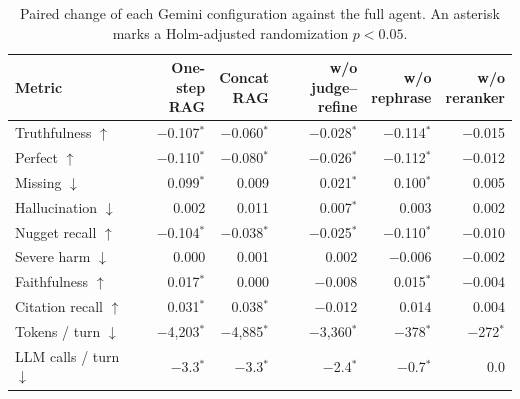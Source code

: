 \begin{table}[tb]
\centering
\caption{Paired change of each Gemini configuration against the full agent. An asterisk marks a Holm-adjusted randomization $p<0.05$.}\label{tab:e2e-ablation}
\footnotesize
\begin{tabular}{l@{\hspace{1em}}r@{\hspace{1em}}r@{\hspace{1em}}r@{\hspace{1em}}r@{\hspace{1em}}r}
\toprule
Metric & \colhead{One-step\\RAG} & \colhead{Concat\\RAG} & \colhead{w/o judge--\\refine} & \colhead{w/o\\rephrase} & \colhead{w/o\\reranker} \\
\midrule
Truthfulness $\uparrow$ & $-$0.107$^{*}$ & $-$0.060$^{*}$ & $-$0.028$^{*}$ & $-$0.114$^{*}$ & $-$0.015 \\
Perfect $\uparrow$ & $-$0.110$^{*}$ & $-$0.080$^{*}$ & $-$0.026$^{*}$ & $-$0.112$^{*}$ & $-$0.012 \\
Missing $\downarrow$ & 0.099$^{*}$ & 0.009 & 0.021$^{*}$ & 0.100$^{*}$ & 0.005 \\
Hallucination $\downarrow$ & 0.002 & 0.011 & 0.007$^{*}$ & 0.003 & 0.002 \\
Nugget recall $\uparrow$ & $-$0.104$^{*}$ & $-$0.038$^{*}$ & $-$0.025$^{*}$ & $-$0.110$^{*}$ & $-$0.010 \\
Severe harm $\downarrow$ & 0.000 & 0.001 & 0.002 & $-$0.006 & $-$0.002 \\
Faithfulness $\uparrow$ & 0.017$^{*}$ & 0.000 & $-$0.008 & 0.015$^{*}$ & $-$0.004 \\
Citation recall $\uparrow$ & 0.031$^{*}$ & 0.038$^{*}$ & $-$0.012 & 0.014 & 0.004 \\
Tokens / turn $\downarrow$ & $-$4{,}203$^{*}$ & $-$4{,}885$^{*}$ & $-$3{,}360$^{*}$ & $-$378$^{*}$ & $-$272$^{*}$ \\
LLM calls / turn $\downarrow$ & $-$3.3$^{*}$ & $-$3.3$^{*}$ & $-$2.4$^{*}$ & $-$0.7$^{*}$ & 0.0 \\
\bottomrule
\end{tabular}
\end{table}
